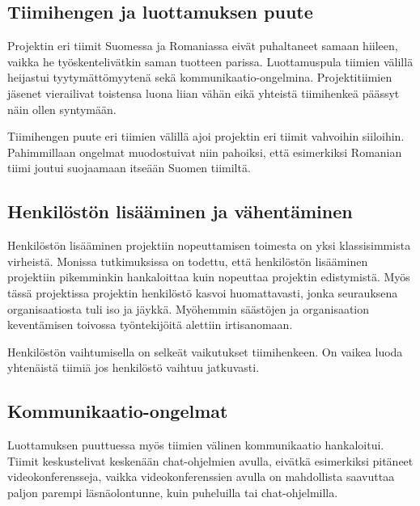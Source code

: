 \documentclass[a4paper]{article}
\begin{document}
\subsection{Tiimihengen ja luottamuksen puute}

Projektin eri tiimit Suomessa ja Romaniassa eivät puhaltaneet samaan hiileen, vaikka he työskentelivätkin saman tuotteen parissa. Luottamuspula tiimien välillä heijastui tyytymättömyytenä sekä kommunikaatio-ongelmina. Projektitiimien jäsenet vierailivat toistensa luona liian vähän eikä yhteistä tiimihenkeä päässyt näin ollen syntymään.

Tiimihengen puute eri tiimien välillä ajoi projektin eri tiimit vahvoihin siiloihin. Pahimmillaan ongelmat muodostuivat niin pahoiksi, että esimerkiksi Romanian tiimi joutui suojaamaan itseään Suomen tiimiltä.

\subsection{Henkilöstön lisääminen ja vähentäminen}

Henkilöstön lisääminen projektiin nopeuttamisen toimesta on yksi klassisimmista virheistä. Monissa tutkimuksissa on todettu, että henkilöstön lisääminen projektiin pikemminkin hankaloittaa kuin nopeuttaa projektin edistymistä. Myös tässä projektissa projektin henkilöstö kasvoi huomattavasti, jonka seurauksena organisaatiosta tuli iso ja jäykkä. Myöhemmin säästöjen ja organisaation keventämisen toivossa työntekijöitä alettiin irtisanomaan.

Henkilöstön vaihtumisella on selkeät vaikutukset tiimihenkeen. On vaikea luoda yhtenäistä tiimiä jos henkilöstö vaihtuu jatkuvasti. 

\subsection{Kommunikaatio-ongelmat}

Luottamuksen puuttuessa myös tiimien välinen kommunikaatio hankaloitui. Tiimit keskustelivat keskenään chat-ohjelmien avulla, eivätkä esimerkiksi pitäneet videokonferensseja, vaikka videokonferenssien avulla on mahdollista saavuttaa paljon parempi läsnäolontunne, kuin puheluilla tai chat-ohjelmilla.
\end{document}
